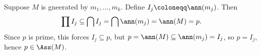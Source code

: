 Suppose $M$ is gneerated by $m_1, \ldots, m_k$. Define $I_j\coloneqq \ann(m_j)$.
Then \[ \prod I_j \subseteq \bigcap I_j = \bigcap \ann(m_j) = \ann(M) = p. \]
Since $p$ is prime, this forces $I_j \subseteq p$, but
$p = \ann(M) \subseteq \ann(m_j) = I_j$, so $p = I_j$, hence
$p \in \Ass(M)$.
